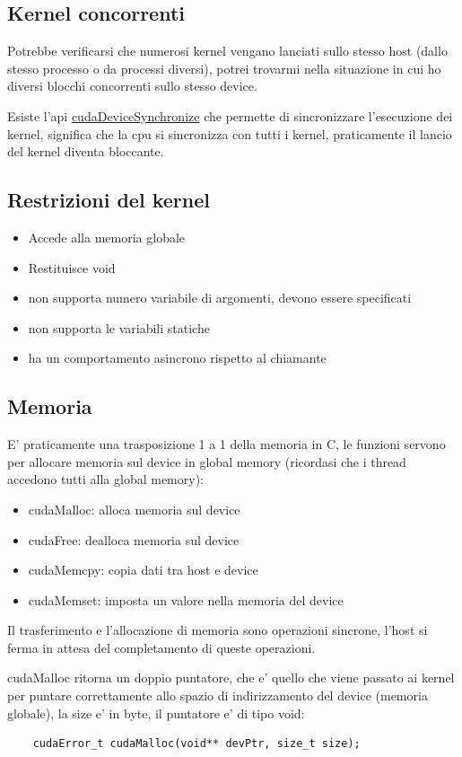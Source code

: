 \subsection{Kernel concorrenti}
Potrebbe verificarsi che numerosi kernel vengano lanciati sullo stesso host (dallo stesso processo o da processi diversi), potrei trovarmi nella situazione in cui ho diversi blocchi concorrenti sullo stesso device.

Esiste l'api \underline{cudaDeviceSynchronize} che permette di sincronizzare l'esecuzione dei kernel, significa che la cpu si sincronizza con tutti i kernel, praticamente il lancio del kernel diventa bloccante.

\subsection{Restrizioni del kernel}
\begin{itemize}
    \item Accede alla memoria globale
    \item Restituisce void
    \item non supporta numero variabile di argomenti, devono essere specificati
    \item non supporta le variabili statiche
    \item ha un comportamento asincrono rispetto al chiamante
\end{itemize}

\subsection{Memoria}
E' praticamente una trasposizione 1 a 1 della memoria in C, le funzioni servono per allocare memoria sul device in global memory (ricordasi che i thread accedono tutti alla global memory):
\begin{itemize}
    \item cudaMalloc: alloca memoria sul device
    \item cudaFree: dealloca memoria sul device
    \item cudaMemcpy: copia dati tra host e device
    \item cudaMemset: imposta un valore nella memoria del device
\end{itemize}
Il trasferimento e l'allocazione di memoria sono operazioni sincrone, l'host si ferma in attesa del completamento di queste operazioni.

cudaMalloc ritorna un doppio puntatore, che e' quello che viene passato ai kernel per puntare correttamente allo spazio di indirizzamento del device (memoria globale), la size e' in byte, il puntatore e' di tipo void\*:
\begin{lstlisting}
    cudaError_t cudaMalloc(void** devPtr, size_t size);
\end{lstlisting}

